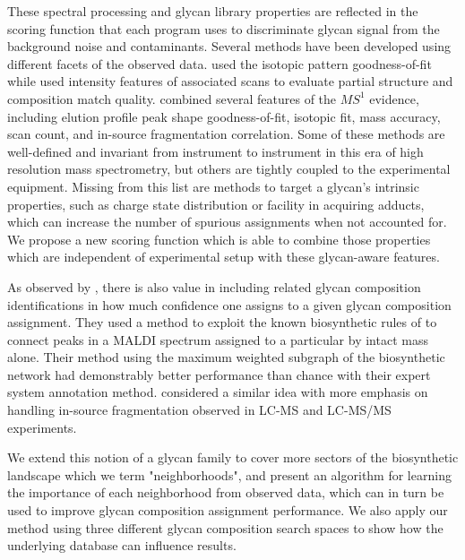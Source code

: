 These spectral processing and glycan library properties are reflected in the
scoring function that each program uses to discriminate glycan signal from
the background noise and contaminants. Several methods have been developed
using different facets of the observed data. \cite{Yu2013} used the isotopic pattern
goodness-of-fit while \cite{Peltoniemi2013} used intensity features of associated \msn
scans to evaluate partial structure and composition match quality. \cite{Kronewitter2014} combined
several features of the $MS^1$ evidence, including elution profile peak shape goodness-of-fit,
isotopic fit, mass accuracy, scan count, and in-source fragmentation correlation. Some of these methods
are well-defined and invariant from instrument to instrument in this era of high resolution
mass spectrometry, but others are tightly coupled to the experimental equipment. Missing from
this list are methods to target a glycan's intrinsic properties, such as charge state distribution
or facility in acquiring adducts, which can increase the number of spurious assignments when not
accounted for. We propose a new scoring function which is able to combine those properties which
are independent of experimental setup with these glycan-aware features.

As observed by \cite{Goldberg2009}, there is also value in including related glycan
composition identifications in how much confidence one assigns to a given glycan
composition assignment. They used a method to exploit the known biosynthetic rules of
\nglycans to connect peaks in a MALDI spectrum assigned to a particular \nglycan by
intact mass alone. Their method using the maximum weighted subgraph of the biosynthetic
network had demonstrably better performance than chance with their expert system annotation
method. \cite{Kronewitter2014} considered a similar idea with more emphasis on handling
in-source fragmentation observed in LC-MS and LC-MS/MS experiments.

We extend this notion of a glycan family to cover more sectors of the biosynthetic
landscape which we term "neighborhoods", and present an algorithm for learning the
importance of each neighborhood from observed data, which can in turn be used to
improve glycan composition assignment performance. We also apply our method using
three different glycan composition search spaces to show how the underlying database
can influence results.
